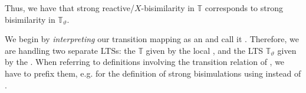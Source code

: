 \begin{isabellebody}
\begin{isamarkuptext}
Thus, we have that strong reactive/$X$-bisimilarity in $\mathbb{T}$ corresponds to strong bisimilarity in $\mathbb{T}_\vartheta$.%
\end{isamarkuptext}\isamarkuptrue%
%
\isadelimdocument
%
\endisadelimdocument
%
\isatagdocument
%
\isamarkuptrue%
%
\endisatagdocument
{\isafolddocument}%
%
\isadelimdocument
%
\endisadelimdocument
%
\begin{isamarkuptext}%
We begin by \emph{interpreting} our transition mapping  as an  and call it . Therefore, we are handling two separate LTSs: the \LTSt{} $\mathbb{T}$ given by the local , and the LTS $\mathbb{T}_\vartheta$ given by the .
When referring to definitions involving the transition relation of , we have to prefix them, e.g.\@ {} for the definition of strong bisimulations using \isa{{\isasymlongmapsto}\isactrlsup {\isasymtheta}} instead of \isa{{\isasymlongmapsto}}.


\end{isamarkuptext}
\end{isabellebody}
